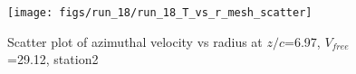 \begin{figure}[H]
\centering
\texttt{[image: figs/run\_18/run\_18\_T\_vs\_r\_mesh\_scatter]}
\caption{Scatter plot of azimuthal velocity vs radius at $z/c$=6.97, $V_{free}$=29.12, station2}
\label{fig:run_18_T_vs_r_mesh_scatter}
\end{figure}


